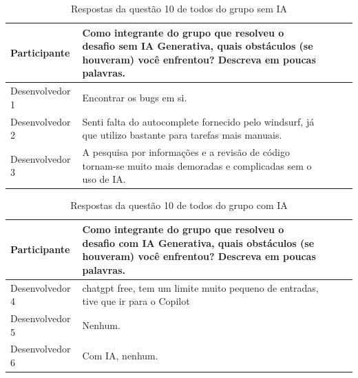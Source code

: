 \documentclass[english,brazilian]{UNISINOSartigo} %
\begin{document}
\begin{table}[ht]
    \caption{Respostas da questão 10 de todos do grupo sem IA}
    \label{tab:questao10_sem_ia}
    \centering%
    \footnotesize
    \begin{tabularx}{\textwidth}{lXXXX}
        \toprule
        \textbf{Participante} & \textbf{Como integrante do grupo que resolveu o desafio sem IA Generativa, quais obstáculos (se houveram) você enfrentou? Descreva em poucas palavras.} \\
        \midrule
        Desenvolvedor 1 & Encontrar os bugs em si. \\
        \midrule
        Desenvolvedor 2 & Senti falta do autocomplete fornecido pelo windsurf, já que utilizo bastante para tarefas mais manuais. \\
        \midrule
        Desenvolvedor 3 & A pesquisa por informações e a revisão de código tornam-se muito mais demoradas e complicadas sem o uso de IA. \\
        \bottomrule
    \end{tabularx}
\end{table}
\FloatBarrier

\begin{table}[ht]
    \caption{Respostas da questão 10 de todos do grupo com IA}
    \label{tab:questao10_com_ia}
    \centering%
    \footnotesize
    \begin{tabularx}{\textwidth}{lXXXX}
        \toprule
        \textbf{Participante} & \textbf{Como integrante do grupo que resolveu o desafio com IA Generativa, quais obstáculos (se houveram) você enfrentou? Descreva em poucas palavras.} \\
        \midrule
        Desenvolvedor 4 & chatgpt free, tem um limite muito pequeno de entradas, tive que ir para o Copilot \\
        \midrule
        Desenvolvedor 5 & Nenhum. \\
        \midrule
        Desenvolvedor 6 & Com IA, nenhum. \\
        \bottomrule
    \end{tabularx}
\end{table}
\FloatBarrier
\end{document}
